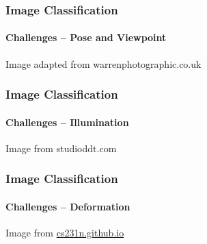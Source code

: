 \documentclass[xetex,professionalfont]{beamer}
\begin{document}
\begin{frame}
\frametitle{Image Classification}
\framesubtitle{Challenges -- Pose and Viewpoint}

\begin{center}
    {\centering Image adapted from warrenphotographic.co.uk} %
\end{center}

\end{frame}


\begin{frame}
\frametitle{Image Classification}
\framesubtitle{Challenges -- Illumination}

\begin{center}
    {\centering Image from studioddt.com}
\end{center}

\end{frame}


\begin{frame}
\frametitle{Image Classification}
\framesubtitle{Challenges -- Deformation}

\begin{center}
    {\centering Image from \href{http://cs231n.github.io/}{cs231n.github.io}} %
\end{center}

\end{frame}
\end{document}
